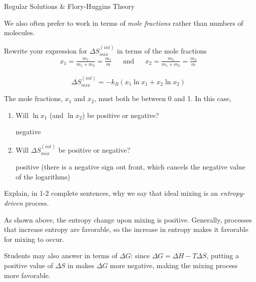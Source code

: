 \begin{activity}{Regular Solutions \& Flory-Huggins Theory}
\begin{ctqs}
	\question We also often prefer to work in terms of \emph{mole fractions} rather than numbers of molecules. \label{ctq:Smixed}
	
		Rewrite your expression for $\Delta S_{mix}^{(int)}$ in terms of the mole fractions
		\begin{align*}
			x_1 = \frac{m_1}{m_1 + m_2} = \frac{m_1}{m} && \text{and} && x_2 = \frac{m_2}{m_1+m_2} = \frac{m_2}{m}
		\end{align*}
		
			\begin{solution}[0.75in]{}
			
				\begin{equation*}
					\Delta S_{mix}^{(int)} = -k_B\left(x_1 \ln x_1 + x_2 \ln x_2 \right)
				\end{equation*}
			\end{solution}
		
	\question The mole fractions, $x_1$ and $x_2$, must both be between 0 and 1.  In this case,
		\begin{enumerate}
			\item Will $\ln x_1$ (and $\ln x_2$) be positive or negative?
	
				\begin{solution}[1in]{}
					negative
				\end{solution}
				
			\item Will $\Delta S_{mix}^{(int)}$ be positive or negative? \label{ctq:Spositive}
	
				\begin{solution}[1in]{}
					positive (there is a negative sign out front, which cancels the negative value of the logarithms)
				\end{solution}
				
		\end{enumerate}
		
	\question Explain, in 1-2 complete sentences, why we say that ideal mixing is an \emph{entropy-driven} process.
	
		\begin{solution}[2.5in]{}
		
			As shown above, the entropy change upon mixing is positive.  Generally, processes that increase entropy are favorable, so the increase in entropy makes it favorable for mixing to occur.
			
			Students may also answer in terms of $\Delta G$: since $\Delta G = \Delta H - T\Delta S$, putting a positive value of $\Delta S$ in makes $\Delta G$ more negative, making the mixing process more favorable.
		\end{solution}
		

\end{ctqs}
\end{activity}

